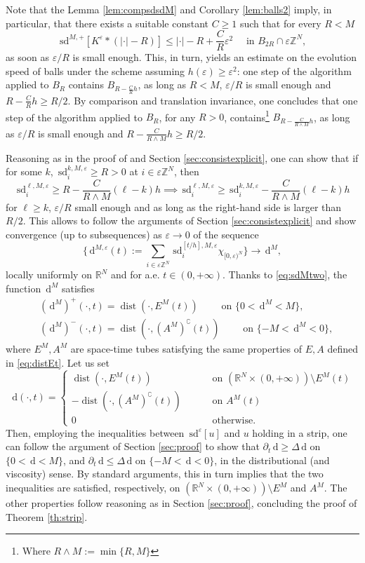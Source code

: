 \documentclass[10pt]{amsart}
\theoremstyle{plain}
\theoremstyle{definition}
\newcommand{\R}{\mathbb{R}}
\newcommand{\Z}{\mathbb{Z}}
\newcommand{\comp}[1]{{#1}^\complement}
\DeclareMathOperator{\dist}{dist}
\newcommand{\e}{\varepsilon}
\newcommand{\ud}{\,\mathrm{d}}
\newcommand{\sd}{\,\mathrm{sd}}
\newcommand{\ez}{\e\Z^N}
\numberwithin{equation}{section}
\begin{document}
Note that the Lemma \ref{lem:compsdsdM} and Corollary \ref{lem:balls2} imply, in particular, that there exists a suitable constant $C\ge 1$ such that for every $R<M$
\[ \sd^{M,+}[K^\e\ast (|\cdot|-R)]\le |\cdot | - R + \frac CR \e^2 \quad \text{ in } B_{2R}\cap \ez,  \]
as soon as  $\e/R$ is small enough. This, in turn, yields an estimate on the evolution speed of balls under the scheme assuming $h(\e)\ge \e^2$: one step of the algorithm applied to $B_R$ contains $B_{R-\frac CR h}$, as long as $R<M$, $\e/R$ is small enough and $R-\frac CR h\ge R/2$. By comparison and translation invariance,  one concludes that one step of the algorithm applied to $B_R$, for any $R>0$,  contains\footnote{Where $R\wedge M:=\min\{R, M\}$} $B_{R-\frac C{R\wedge M} h}$, as long as  $\e/R$ is small enough and $R-\frac C{R\wedge M} h\ge R/2$.
 

Reasoning as in the proof of \cite[Cor.~4.13]{CDGM-crystal} and Section \ref{sec:consistexplicit}, one can show that if for some $k$, $\sd^{k,M,\e}_i\ge R>0$ at $i\in\ez$, then
\[
  \sd^{\ell,M,\e}_i \ge R- \frac{C}{R\wedge M}(\ell - k )h \implies \sd^{\ell,M,\e}_i \ge \sd^{k,M,\e}_i- \frac{C}{R\wedge M}(\ell - k )h
\]
for $\ell \ge k$, $\e/R$ small enough  and as long as the right-hand side is larger than $R/2$. This allows to follow the arguments of Section \ref{sec:consistexplicit} and show convergence (up to subsequences) as $\e\to 0$ of the sequence 
\[  \{ \ud^{M,\e}(t):= \sum_{i\in\ez}\sd^{[ t/h],M,\e}_i \chi_{[0,\e)^N}\} \to \ud^M,\]
locally uniformly on $\R^N$ and for a.e. $t\in (0,+\infty)$. 
Thanks to \eqref{eq:sdMtwo}, the  function $\ud^M$ satisfies
\begin{align*}%
  &(\ud^M)^+(\cdot,t) = \dist(\cdot,E^M(t)) \qquad \text{ on } \{0<\ud^M<M\}, \\
  &(\ud^M)^-(\cdot,t) = \dist(\cdot,\comp{(A^M)}(t))\qquad \text{ on }\{-M<\ud^M<0\},
\end{align*}
where $E^M,A^M$  are space-time tubes satisfying the same properties of $E,A$ defined in \eqref{eq:distEt}.
Let us set 
\[ \ud(\cdot,t)=\begin{cases}
  \dist(\cdot,E^M(t)) \qquad &\text{ on } (\R^N\times (0,+\infty))\setminus E^M(t)\\
  -\dist(\cdot,\comp{(A^M)}(t))\qquad &\text{ on } A^M(t)\\
  0 \qquad &\text{ otherwise.}
\end{cases} \]
Then, employing the inequalities between $\sd^{\e}[u]$ and $u$ holding in a strip, one can follow the argument of Section \ref{sec:proof} to show that  $\partial_t \ud\ge \Delta \ud$ on $\{0<\ud<M\}$, and  $\partial_t \ud\le \Delta \ud$ on $\{-M<\ud<0\}$, 
in the distributional (and viscosity) sense. By standard arguments, this in turn implies that the two inequalities are satisfied, respectively, on $(\R^N\times (0,+\infty))\setminus E^M $ and  $A^M $.
The other properties follow reasoning as in Section \ref{sec:proof}, concluding the proof of Theorem \ref{th:strip}.
 
\end{document}
